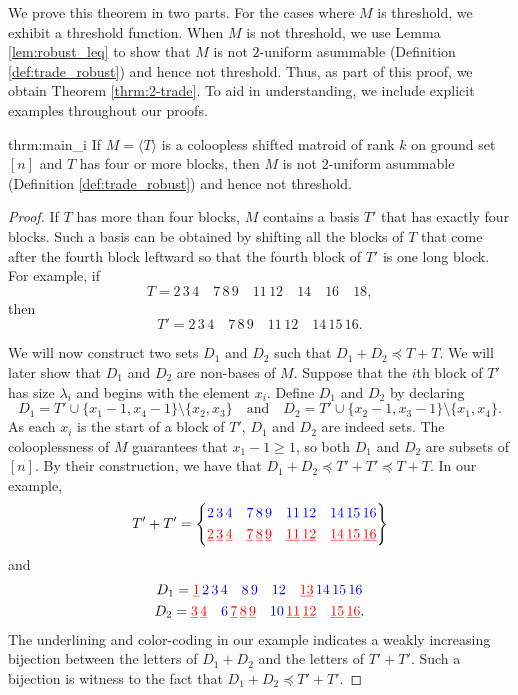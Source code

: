 \documentclass[10pt,a4paper]{amsart}
\theoremstyle{definition}
\theoremstyle{plain}
\begin{document}
We prove this theorem in two parts. For the cases where $M$ is threshold, we exhibit a threshold function. When $M$ is not threshold, we use Lemma \ref{lem:robust_leq} to show that $M$ is not $2$-uniform asummable (Definition \ref{def:trade_robust}) and hence not threshold. Thus, as part of this proof, we obtain Theorem \ref{thrm:2-trade}. To aid in understanding, we include explicit examples throughout our proofs.
\begin{reptheorem}{thrm:main_i}
\label{prop:4blocks}
If $M=\langle T\rangle$ is a coloopless shifted matroid of rank $k$ on ground set $[n]$ and $T$ has four or more blocks, then $M$ is not $2$-uniform asummable (Definition \ref{def:trade_robust}) and hence not threshold. 
\end{reptheorem}
\begin{proof}
  If $T$ has more than four blocks, $M$ contains a basis $T'$ that has exactly four blocks. Such a basis can be obtained by shifting all the blocks of $T$ that come after the fourth block leftward so that the fourth block of $T'$ is one long block. For example, if \[T= 2\,3\,4\quad7\,8\,9\quad 11\,12 \quad 14\quad 16\quad 18,\] then \[T'=2\,3\,4\quad 7\,8\,9\quad 11\,12\quad 14\,15\,16.\]

  We will now construct two sets $D_1$ and $D_2$ such that $D_1+ D_2 \preceq T+T$. We will later show that $D_1$ and $D_2$ are non-bases of $M$. Suppose that the $i$th block of $T'$ has size $\lambda_i$ and begins with the element $x_i$. Define $D_1$ and $D_2$ by declaring
  \[D_1 = T'\cup \{x_1-1,x_4-1\} \setminus \{x_2,x_3\}\quad\text{and}\quad D_2= T'\cup \{x_2-1,x_3-1\} \setminus \{x_1,x_4\}.\]
  As each $x_i$ is the start of a block of $T'$, $D_1$ and $D_2$ are indeed sets. The colooplessness of $M$ guarantees that $x_1-1\geq 1$, so both $D_1$ and $D_2$ are subsets of $[n]$. By their construction, we have that $D_1+D_2 \preceq T'+T'\preceq T+T$. In our example,
\[
T'+T' = \left\{ \begin{aligned} {\color{blue}2\,3\,4\quad 7\,8\,9\quad 11\,12\quad  14\,15\,16}\\
\underline{\color{red}2}\,\underline{\color{red}3}\,\underline{\color{red}4}\quad \underline{\color{red}7}\,\underline{\color{red}8}\,\underline{\color{red}9}\quad \underline{\color{red}11}\,\underline{\color{red}12}\quad \underline{\color{red}14}\,\underline{\color{red}15}\,\underline{\color{red}16}
\end{aligned} \right\}
\]
and
\begin{gather*}
D_1 = \underline{\color{red}1}\,{\color{blue}2\,3\, 4\quad 8\,9\quad 12}\quad \underline{\color{red}13}\, {\color{blue}14\,15\,16}\\
D_2 = \underline{\color{red}3}\,\underline{\color{red}4}\quad {\color{blue}6}\, \underline{\color{red}7}\,\underline{\color{red}8}\,\underline{\color{red}9}\quad{\color{blue} 10}\,\underline{\color{red}11}\, \underline{\color{red}12}\quad \underline{\color{red}15}\,\underline{\color{red}16}.
\end{gather*}
The underlining and color-coding in our example indicates a weakly increasing bijection between the letters of $D_1+D_2$ and the letters of $T'+T'$. Such a bijection is witness to the fact that $D_1+D_2 \preceq T'+T'$.


\end{proof}
\end{document}
